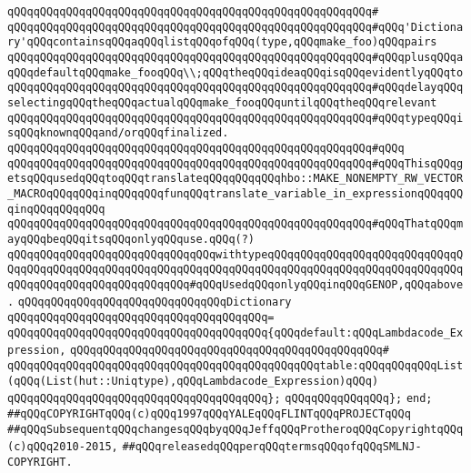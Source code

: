 \verb|qQQqqQQqqQQqqQQqqQQqqQQqqQQqqQQqqQQqqQQqqQQqqQQqqQQqqQQq#|\newline
\verb|qQQqqQQqqQQqqQQqqQQqqQQqqQQqqQQqqQQqqQQqqQQqqQQqqQQqqQQq#qQQq'Dictionary'qQQqcontainsqQQqaqQQqlistqQQqofqQQq(type,qQQqmake_foo)qQQqpairs|\newline
\verb|qQQqqQQqqQQqqQQqqQQqqQQqqQQqqQQqqQQqqQQqqQQqqQQqqQQqqQQq#qQQqplusqQQqaqQQqdefaultqQQqmake_fooqQQq\\;qQQqtheqQQqideaqQQqisqQQqevidentlyqQQqto|\newline
\verb|qQQqqQQqqQQqqQQqqQQqqQQqqQQqqQQqqQQqqQQqqQQqqQQqqQQqqQQq#qQQqdelayqQQqselectingqQQqtheqQQqactualqQQqmake_fooqQQquntilqQQqtheqQQqrelevant|\newline
\verb|qQQqqQQqqQQqqQQqqQQqqQQqqQQqqQQqqQQqqQQqqQQqqQQqqQQqqQQq#qQQqtypeqQQqisqQQqknownqQQqand/orqQQqfinalized.|\newline
\verb|qQQqqQQqqQQqqQQqqQQqqQQqqQQqqQQqqQQqqQQqqQQqqQQqqQQqqQQq#qQQq|\newline
\verb|qQQqqQQqqQQqqQQqqQQqqQQqqQQqqQQqqQQqqQQqqQQqqQQqqQQqqQQq#qQQqThisqQQqgetsqQQqusedqQQqtoqQQqtranslateqQQqqQQqqQQqhbo::MAKE_NONEMPTY_RW_VECTOR_MACROqQQqqQQqinqQQqqQQqfunqQQqtranslate_variable_in_expressionqQQqqQQqinqQQqqQQqqQQq|\newline
\verb|qQQqqQQqqQQqqQQqqQQqqQQqqQQqqQQqqQQqqQQqqQQqqQQqqQQqqQQq#qQQqThatqQQqmayqQQqbeqQQqitsqQQqonlyqQQquse.qQQq(?)|\newline
\newline
\verb|qQQqqQQqqQQqqQQqqQQqqQQqqQQqqQQqwithtypeqQQqqQQqqQQqqQQqqQQqqQQqqQQqqQQqqQQqqQQqqQQqqQQqqQQqqQQqqQQqqQQqqQQqqQQqqQQqqQQqqQQqqQQqqQQqqQQqqQQqqQQqqQQqqQQqqQQqqQQqqQQqqQQq#qQQqUsedqQQqonlyqQQqinqQQqGENOP,qQQqabove.|\newline
\verb|qQQqqQQqqQQqqQQqqQQqqQQqqQQqqQQqDictionary|\newline
\verb|qQQqqQQqqQQqqQQqqQQqqQQqqQQqqQQqqQQqqQQq=|\newline
\verb|qQQqqQQqqQQqqQQqqQQqqQQqqQQqqQQqqQQqqQQq{qQQqdefault:qQQqLambdacode_Expression,|\newline
\verb|qQQqqQQqqQQqqQQqqQQqqQQqqQQqqQQqqQQqqQQqqQQqqQQq#|\newline
\verb|qQQqqQQqqQQqqQQqqQQqqQQqqQQqqQQqqQQqqQQqqQQqqQQqtable:qQQqqQQqqQQqList(qQQq(List(hut::Uniqtype),qQQqLambdacode_Expression)qQQq)|\newline
\verb|qQQqqQQqqQQqqQQqqQQqqQQqqQQqqQQqqQQqqQQq};|\newline
\newline
\verb|qQQqqQQqqQQqqQQq};|\newline
\verb|end;|\newline
\newline
\newline
\verb|##qQQqCOPYRIGHTqQQq(c)qQQq1997qQQqYALEqQQqFLINTqQQqPROJECTqQQq|\newline
\verb|##qQQqSubsequentqQQqchangesqQQqbyqQQqJeffqQQqProtheroqQQqCopyrightqQQq(c)qQQq2010-2015,|\newline
\verb|##qQQqreleasedqQQqperqQQqtermsqQQqofqQQqSMLNJ-COPYRIGHT.|\newline

